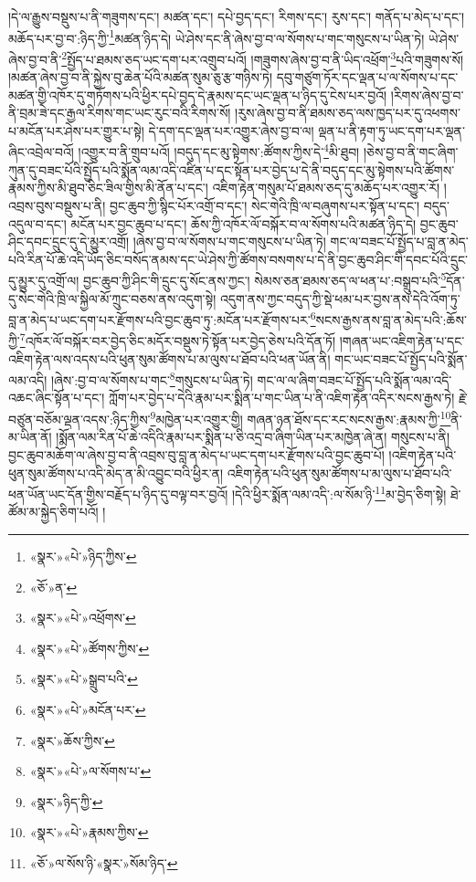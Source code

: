 །དེ་ལ་རྒྱུས་བསྡུས་པ་ནི་གཟུགས་དང་། མཚན་དང་། དཔེ་བྱད་དང་། རིགས་དང་། རུས་དང་། གནོད་པ་མེད་པ་དང་། མཆོད་པར་བྱ་བ་:ཉིད་ཀྱི་\footnote{«སྣར་»«པེ་»ཉིད་ཀྱིས་}མཚན་ཉིད་དེ། ཡེ་ཤེས་དང་ནི་ཞེས་བྱ་བ་ལ་སོགས་པ་གང་གསུངས་པ་ཡིན་ཏེ། ཡེ་ཤེས་ཞེས་བྱ་བ་ནི་\footnote{«ཅོ་»ན་}སྤྱོད་པ་ཐམས་ཅད་ཡང་དག་པར་འགྲུབ་པའོ། །གཟུགས་ཞེས་བྱ་བ་ནི་ཡིད་འཕྲོག་\footnote{«སྣར་»«པེ་»འཕྲོགས་}པའི་གཟུགས་སོ། །མཚན་ཞེས་བྱ་བ་ནི་སྐྱེས་བུ་ཆེན་པོའི་མཚན་སུམ་ཅུ་རྩ་གཉིས་ཏེ། དབུ་གཙུག་ཏོར་དང་ལྡན་པ་ལ་སོགས་པ་དང་མཚན་གྱི་འཁོར་དུ་གཏོགས་པའི་ཕྱིར་དཔེ་བྱད་དེ་རྣམས་དང་ཡང་ལྡན་པ་ཉིད་དུ་ངེས་པར་བྱའོ། །རིགས་ཞེས་བྱ་བ་ནི་བྲམ་ཟེ་དང་རྒྱལ་རིགས་གང་ཡང་རུང་བའི་རིགས་སོ། །རུས་ཞེས་བྱ་བ་ནི་ཐམས་ཅད་ལས་ཁྱད་པར་དུ་འཕགས་པ་མངོན་པར་ཤེས་པར་གྱུར་པ་སྟེ། དེ་དག་དང་ལྡན་པར་འགྱུར་ཞེས་བྱ་བ་ལ། ལྡན་པ་ནི་རྟག་ཏུ་ཡང་དག་པར་ལྡན་ཞིང་འབྲེལ་བའོ། །འགྱུར་བ་ནི་གྲུབ་པའོ། །བདུད་དང་མུ་སྟེགས་:ཚོགས་ཀྱིས་དེ་\footnote{«སྣར་»«པེ་»ཚོགས་ཀྱིས་}མི་ཐུབ། །ཅེས་བྱ་བ་ནི་གང་ཞིག་ཀུན་དུ་བཟང་པོའི་སྤྱོད་པའི་སྨོན་ལམ་འདི་འཛིན་པ་དང་སྟོན་པར་བྱེད་པ་དེ་ནི་བདུད་དང་མུ་སྟེགས་པའི་ཚོགས་རྣམས་ཀྱིས་མི་ཐུབ་ཅིང་ཟིལ་གྱིས་མི་ནོན་པ་དང་། འཇིག་རྟེན་གསུམ་པོ་ཐམས་ཅད་དུ་མཆོད་པར་འགྱུར་རོ། །འབྲས་བུས་བསྡུས་པ་ནི། བྱང་ཆུབ་ཀྱི་སྙིང་པོར་འགྲོ་བ་དང་། སེང་གེའི་ཁྲི་ལ་བཞུགས་པར་སྟོན་པ་དང་། བདུད་འདུལ་བ་དང་། མངོན་པར་བྱང་ཆུབ་པ་དང་། ཆོས་ཀྱི་འཁོར་ལོ་བསྐོར་བ་ལ་སོགས་པའི་མཚན་ཉིད་དེ། བྱང་ཆུབ་ཤིང་དབང་དྲུང་དུ་དེ་མྱུར་འགྲོ། །ཞེས་བྱ་བ་ལ་སོགས་པ་གང་གསུངས་པ་ཡིན་ཏེ། གང་ལ་བཟང་པོ་སྤྱོད་པ་བླ་ན་མེད་པའི་རིན་པོ་ཆེ་འདི་ཡོད་ཅིང་བསོད་ནམས་དང་ཡེ་ཤེས་ཀྱི་ཚོགས་བསགས་པ་དེ་ནི་བྱང་ཆུབ་ཤིང་གི་དབང་པོའི་དྲུང་དུ་མྱུར་དུ་འགྲོ་ལ། བྱང་ཆུབ་ཀྱི་ཤིང་གི་དྲུང་དུ་སོང་ནས་ཀྱང་། སེམས་ཅན་ཐམས་ཅད་ལ་ཕན་པ་:བསྒྲུབ་པའི་\footnote{«སྣར་»«པེ་»སྒྲུབ་པའི་}དོན་དུ་སེང་གེའི་ཁྲི་ལ་སྐྱིལ་མོ་ཀྲུང་བཅས་ནས་འདུག་སྟེ། འདུག་ནས་ཀྱང་བདུད་ཀྱི་སྡེ་ཕམ་པར་བྱས་ནས་དེའི་འོག་ཏུ་བླ་ན་མེད་པ་ཡང་དག་པར་རྫོགས་པའི་བྱང་ཆུབ་ཏུ་:མངོན་པར་རྫོགས་པར་\footnote{«སྣར་»«པེ་»མངོན་པར་}སངས་རྒྱས་ནས་བླ་ན་མེད་པའི་:ཆོས་ཀྱི་\footnote{«སྣར་»ཆོས་ཀྱིས་}འཁོར་ལོ་བསྐོར་བར་བྱེད་ཅིང་མདོར་བསྡུས་ཏེ་སྟོན་པར་བྱེད་ཅེས་པའི་དོན་ཏོ། །གཞན་ཡང་འཇིག་རྟེན་པ་དང་འཇིག་རྟེན་ལས་འདས་པའི་ཕུན་སུམ་ཚོགས་པ་མ་ལུས་པ་ཐོབ་པའི་ཕན་ཡོན་ནི། གང་ཡང་བཟང་པོ་སྤྱོད་པའི་སྨོན་ལམ་འདི། །ཞེས་:བྱ་བ་ལ་སོགས་པ་གང་\footnote{«སྣར་»«པེ་»ལ་སོགས་པ་}གསུངས་པ་ཡིན་ཏེ། གང་ལ་ལ་ཞིག་བཟང་པོ་སྤྱོད་པའི་སྨོན་ལམ་འདི་འཆང་ཞིང་སྟོན་པ་དང་། ཀློག་པར་བྱེད་པ་དེའི་རྣམ་པར་སྨིན་པ་གང་ཡིན་པ་ནི་འཇིག་རྟེན་འདིར་སངས་རྒྱས་ཏེ། རྗེ་བཙུན་བཅོམ་ལྡན་འདས་:ཉིད་ཀྱིས་\footnote{«སྣར་»ཉིད་ཀྱི་}མཁྱེན་པར་འགྱུར་གྱི། གཞན་ཉན་ཐོས་དང་རང་སངས་རྒྱས་:རྣམས་ཀྱི་\footnote{«སྣར་»«པེ་»རྣམས་ཀྱིས་}ནི་མ་ཡིན་ནོ། །སྨོན་ལམ་རིན་པོ་ཆེ་འདིའི་རྣམ་པར་སྨིན་པ་ཅི་འདྲ་བ་ཞིག་ཡིན་པར་མཁྱེན་ཞེ་ན། གསུངས་པ་ནི། བྱང་ཆུབ་མཆོག་ལ་ཞེས་བྱ་བ་ནི་འབྲས་བུ་བླ་ན་མེད་པ་ཡང་དག་པར་རྫོགས་པའི་བྱང་ཆུབ་པོ། །འཇིག་རྟེན་པའི་ཕུན་སུམ་ཚོགས་པ་འདི་མེད་ན་མི་འབྱུང་བའི་ཕྱིར་ན། འཇིག་རྟེན་པའི་ཕུན་སུམ་ཚོགས་པ་མ་ལུས་པ་ཐོབ་པའི་ཕན་ཡོན་ཡང་དོན་གྱིས་བརྗོད་པ་ཉིད་དུ་བལྟ་བར་བྱའོ། །དེའི་ཕྱིར་སྨོན་ལམ་འདི་:ལ་སོམ་ཉི་\footnote{«ཅོ་»ལ་སོས་ཉི་«སྣར་»སོམ་ཉིད་}མ་བྱེད་ཅིག་སྟེ། ཐེ་ཚོམ་མ་སྐྱེད་ཅིག་པའོ། །
